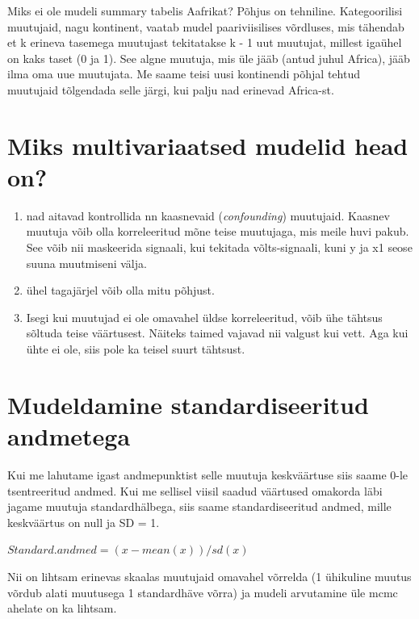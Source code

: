 \documentclass[]{book}
\begin{document}
Miks ei ole mudeli summary tabelis Aafrikat? Põhjus on tehniline. Kategoorilisi muutujaid, nagu kontinent, vaatab mudel paariviisilises võrdluses, mis tähendab et k erineva tasemega muutujast tekitatakse k - 1 uut muutujat, millest igaühel on kaks taset (0 ja 1). See algne muutuja, mis üle jääb (antud juhul Africa), jääb ilma oma uue muutujata. Me saame teisi uusi kontinendi põhjal tehtud muutujaid tõlgendada selle järgi, kui palju nad erinevad Africa-st.

\hypertarget{miks-multivariaatsed-mudelid-head-on}{%
\section*{Miks multivariaatsed mudelid head on?}\label{miks-multivariaatsed-mudelid-head-on}}

\begin{enumerate}
\def\labelenumi{\arabic{enumi})}
\item
  nad aitavad kontrollida nn kaasnevaid (\emph{confounding}) muutujaid.
  Kaasnev muutuja võib olla korreleeritud mõne teise muutujaga, mis meile huvi pakub.
  See võib nii maskeerida signaali, kui tekitada võlts-signaali, kuni y ja x1 seose suuna muutmiseni välja.
\item
  ühel tagajärjel võib olla mitu põhjust.
\item
  Isegi kui muutujad ei ole omavahel üldse korreleeritud, võib ühe tähtsus sõltuda teise väärtusest. Näiteks taimed vajavad nii valgust kui vett. Aga kui ühte ei ole, siis pole ka teisel suurt tähtsust.
\end{enumerate}

\hypertarget{mudeldamine-standardiseeritud-andmetega}{%
\section*{Mudeldamine standardiseeritud andmetega}\label{mudeldamine-standardiseeritud-andmetega}}

Kui me lahutame igast andmepunktist selle muutuja keskväärtuse siis saame 0-le tsentreeritud andmed. Kui me sellisel viisil saadud väärtused omakorda läbi jagame muutuja standardhälbega, siis saame standardiseeritud andmed, mille keskväärtus on null ja SD = 1.

\(Standard.andmed = (x - mean(x))/sd(x)\)

Nii on lihtsam erinevas skaalas muutujaid omavahel võrrelda (1 ühikuline muutus võrdub alati muutusega 1 standardhäve võrra) ja mudeli arvutamine üle mcmc ahelate on ka lihtsam.
\end{document}

